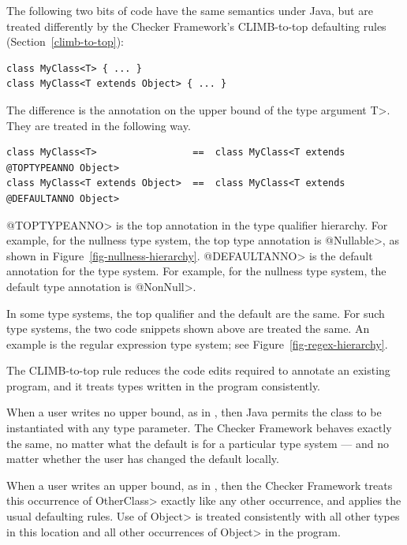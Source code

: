 
The following two bits of code have the same semantics under Java, but are
treated differently by the Checker Framework's CLIMB-to-top defaulting
rules (Section~\ref{climb-to-top}):

\begin{Verbatim}
class MyClass<T> { ... }
class MyClass<T extends Object> { ... }
\end{Verbatim}

The difference is the annotation on the upper bound of the type argument
\<T>.  They are treated in the following way.

\begin{Verbatim}
class MyClass<T>                 ==  class MyClass<T extends @TOPTYPEANNO Object>
class MyClass<T extends Object>  ==  class MyClass<T extends @DEFAULTANNO Object>
\end{Verbatim}

\noindent
\<@TOPTYPEANNO> is the top annotation in the type qualifier hierarchy.  For
example, for the nullness type system, the top type annotation is
\<@Nullable>, as shown in Figure~\ref{fig-nullness-hierarchy}.
\<@DEFAULTANNO> is the default annotation for the type system.  For
example, for the nullness type system, the default type annotation is
\<@NonNull>.

In some type systems, the top qualifier and the default are the same.  For
such type systems, the two code snippets shown above are treated the same.
An example is the regular expression type system; see
Figure~\ref{fig-regex-hierarchy}.

The CLIMB-to-top rule reduces the code edits required to annotate an
existing program, and it treats types written in the program consistently.

When a user writes no upper bound, as in
,
then Java permits the class to be instantiated with any type parameter.
The Checker Framework behaves exactly the same, no matter what the default
is for a particular type system --- and no matter whether the user has
changed the default locally.

When a user writes an upper bound, as in
,
then the Checker Framework treats this occurrence of \<OtherClass> exactly
like any other occurrence, and applies the usual defaulting rules.  Use of
\<Object> is treated consistently with all other types in this location and
all other occurrences of \<Object> in the program.

